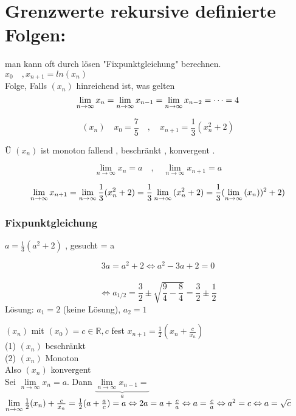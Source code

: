 \newpage

\section{Grenzwerte rekursive definierte Folgen:}

man kann oft durch lösen "Fixpunktgleichung" berechnen.\\
$x_0 \quad , x_{n+1}= ln(x_n)$ \\
Folge, Falls $(x_n)$ hinreichend ist, was gelten 
\[ \lim\limits_{n \rightarrow \infty} x_n= \lim\limits_{n \rightarrow \infty} x_{n-1} = \lim\limits_{n \rightarrow \infty} x_{n-2}=\dots = 4 \]
\begin{example}
\[(x_n) \quad x_0 = \frac{7}{5} \quad,\quad x_{n+1}= \frac{1}{3}(x_n^2+2)  \]

Ü $(x_n)$ ist monoton fallend , beschränkt , konvergent . 

\[\lim\limits_{n \rightarrow \infty}{x_n}=a \quad,\quad 
\lim\limits_{n \rightarrow \infty}{x_{n+1}}=a \]

\begin{equation*}
\begin{aligned}
\lim\limits_{n \rightarrow \infty}{x_{n+1}} 
= \linebreak  
\lim\limits_{n \rightarrow \infty}{\frac{1}{3}(x_n^2 + 2)=
\frac{1}{3}} \lim\limits_{n \rightarrow \infty}{(x_n^2 + 2)}
=
\frac{1}{3} (\lim\limits_{n \rightarrow \infty}{(x_n))^2 + 2)}
\end{aligned}
\end{equation*}
\end{example}

\subsubsection{Fixpunktgleichung }
 $a = \frac{1}{3}(a^2 + 2) $  , gesucht = a
 
\[ 3a = a^2 +2 \Leftrightarrow a^2 -3a+2 = 0 \] \\
\[ \Leftrightarrow a_{1/2} = \frac{3}{2} \pm \sqrt{\frac{9}{4}-\frac{8}{4}}= \frac{3}{2} \pm \frac{1}{2}\]
Lösung:  $a_1 = 2$ (keine Lösung),  $a_2 =1 $

\begin{example}{$(x_n)$ mit $(x_0) = c \in \mathbb{R} , c  $ fest $x_{n+1}= \frac{1}{2}(x_n+\frac{c}{x_n})$ }\\
(1) $(x_n)$ beschränkt \checkmark\\
(2) $(x_n)$ Monoton \checkmark\\
Also $(x_n)$ konvergent \\
Sei $\lim\limits_{n \rightarrow \infty}{x_n}= a $. 
Dann $\underbrace{\lim\limits_{n \rightarrow \infty}{x_{n-1}}= }_{a}$ $\lim\limits_{n \rightarrow \infty}{\frac{1}{2}}(x_n) + \frac{c}{x_n} = \frac{1}{2}(a + \frac{a}{c})= a \\
 \Leftrightarrow 2a = a + \frac{c}{a} \Leftrightarrow a = \frac{c}{a } \Leftrightarrow a^2 = c \Leftrightarrow a = \sqrt{c}$
\end{example}

